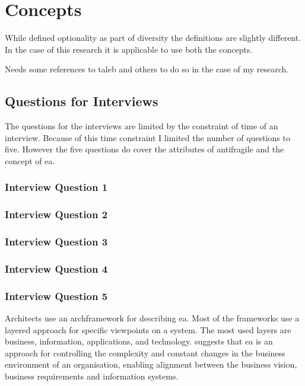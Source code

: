 \chapter{Concepts}



While \parencite[p. 66]{Botjes2020} defined optionality as part of diversity the definitions are slightly different. In the case of this research it is applicable to use both the concepts.
\begin{remark}
Needs some references to taleb and others to do so in the case of my research.
\end{remark}

\section{Questions for Interviews}
\label{sec:questionsforinterviews}
The questions for the interviews are limited by the constraint of time of an interview. Because of this time constraint I limited the number of questions to five. However the five questions do cover the attributes of \gls{antifragile} and the concept of \gls{ea}.


\subsection{Interview Question 1}

\subsection{Interview Question 2}

\subsection{Interview Question 3}

\subsection{Interview Question 4}

\subsection{Interview Question 5}


Architects use an \gls{archframework} for describing \acrshort{ea}. Most of the frameworks use a layered approach for specific viewpoints on a system. The most used layers are business, information, applications, and technology. \textcite[p. 189]{Ylimaeki2005} suggests that \acrshort{ea} is an approach for controlling the complexity and constant changes in the business environment of an organisation, enabling alignment between the business vision, business requirements and information systems.


